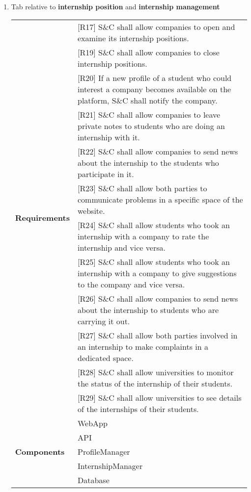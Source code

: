 \begin{enumerate}
    \newpage
    \item Tab relative to \textbf{internship position }and \textbf{ internship management}
    \begin{center}
        \begin{tabular}{ |p{4cm}|p{10cm}| } 
        \hline
        \multirow{12}{6em}{\textbf{Requirements}} 
        & [R17] S\&C shall allow companies to open and examine its internship positions. \\
        & [R19] S\&C shall allow companies to close internship positions. \\
        & [R20] If a new profile of a student who could interest a company becomes available on the platform, S\&C
        shall notify the company. \\
        & [R21] S\&C shall allow companies to leave private notes to students who are doing an internship with it. \\
        & [R22] S\&C shall allow companies to send news about the internship to the students who participate in it. \\
        & [R23] S\&C shall allow both parties to communicate problems in a specific space of the website. \\
        & [R24] S\&C shall allow students who took an internship with a company to rate the internship and vice versa. \\
        & [R25] S\&C shall allow students who took an internship with a company to give suggestions to the company and vice versa. \\
        & [R26] S\&C shall allow companies to send news about the internship to students who are carrying it out. \\
        & [R27] S\&C shall allow both parties involved in an internship to make complaints in a dedicated space. \\
        & [R28] S\&C shall allow universities to monitor the status of the internship of their students. \\
        & [R29] S\&C shall allow universities to see details of the internships of their students. \\
        \hline
        \multirow{5}{6em}{\textbf{Components}} 
        & WebApp \\ 
        & API \\ 
        & ProfileManager \\ 
        & InternshipManager \\
        & Database \\
        \hline
        \end{tabular}
    \end{center}

\end{enumerate}